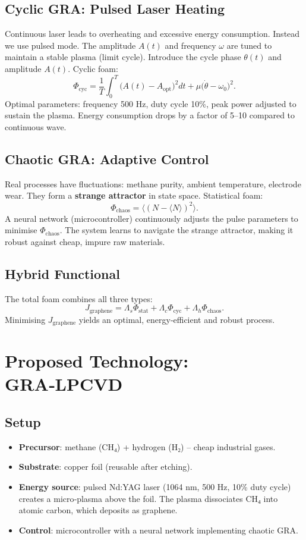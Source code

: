 \documentclass[12pt,a4paper]{article}
\begin{document}
\subsection{Cyclic GRA: Pulsed Laser Heating}

Continuous laser leads to overheating and excessive energy consumption. Instead we use pulsed mode. The amplitude \(A(t)\) and frequency \(\omega\) are tuned to maintain a stable plasma (limit cycle). Introduce the cycle phase \(\theta(t)\) and amplitude \(A(t)\). Cyclic foam:
\[
\Phi_{\text{cyc}} = \frac{1}{T}\int_0^T \bigl(A(t)-A_{\text{opt}}\bigr)^2 dt + \mu \bigl(\dot{\theta} - \omega_0\bigr)^2.
\]
Optimal parameters: frequency 500 Hz, duty cycle 10\%, peak power adjusted to sustain the plasma. Energy consumption drops by a factor of 5–10 compared to continuous wave.

\subsection{Chaotic GRA: Adaptive Control}

Real processes have fluctuations: methane purity, ambient temperature, electrode wear. They form a \textbf{strange attractor} in state space. Statistical foam:
\[
\Phi_{\text{chaos}} = \bigl\langle (N - \langle N \rangle)^2 \bigr\rangle.
\]
A neural network (microcontroller) continuously adjusts the pulse parameters to minimise \(\Phi_{\text{chaos}}\). The system learns to navigate the strange attractor, making it robust against cheap, impure raw materials.

\subsection{Hybrid Functional}

The total foam combines all three types:
\[
J_{\text{graphene}} = \Lambda_s \Phi_{\text{stat}} + \Lambda_c \Phi_{\text{cyc}} + \Lambda_h \Phi_{\text{chaos}}.
\]
Minimising \(J_{\text{graphene}}\) yields an optimal, energy‑efficient and robust process.

\section{Proposed Technology: GRA‑LPCVD}

\subsection{Setup}
\begin{itemize}
    \item \textbf{Precursor}: methane (CH₄) + hydrogen (H₂) – cheap industrial gases.
    \item \textbf{Substrate}: copper foil (reusable after etching).
    \item \textbf{Energy source}: pulsed Nd:YAG laser (1064 nm, 500 Hz, 10\% duty cycle) creates a micro‑plasma above the foil. The plasma dissociates CH₄ into atomic carbon, which deposits as graphene.
    \item \textbf{Control}: microcontroller with a neural network implementing chaotic GRA.
\end{itemize}
\end{document}
